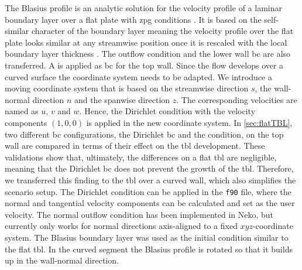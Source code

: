 The Blasius profile is an analytic solution for the velocity profile of a laminar boundary layer over a flat plate with \acrshort{zpg} conditions \citep{blasius_grenzschichtern_1908}.
It is based on the self-similar character of the boundary layer meaning the velocity profile over the flat plate looks similar at any streamwise position once it is rescaled with the local boundary layer thickness \citep{schlichting_boundary-layer_2017}.
The outflow condition and the lower wall \acrshort{bc} are also transferred.
A  is applied as \acrshort{bc} for the top wall.
Since the flow develops over a curved surface the coordinate system needs to be adapted.
We introduce a moving coordinate system that is based on the streamwise direction $s$, the wall-normal direction $n$ and the spanwise direction $z$.
The corresponding velocities are named as $u$, $v$ and $w$.
Hence, the Dirichlet condition with the velocity components $(1,0,0)$ is applied in the new coordinate system.
In \autoref{sec:flatTBL}, two different \acrshort{bc} configurations, the Dirichlet \acrshort{bc} and the  condition, on the top wall are compared in terms of their effect on the \acrshort{tbl} development.
These validations show that, ultimately, the differences on a flat \acrshort{tbl} are negligible, meaning that the Dirichlet \acrshort{bc} does not prevent the growth of the \acrshort{tbl}.
Therefore, we transferred this finding to the \acrshort{tbl} over a curved wall, which also simplifies the scenario setup.
The Dirichlet condition can be applied in the \texttt{f90} file, where the normal and tangential velocity components can be calculated and set as the user velocity. 
The normal outflow condition has been implemented in Neko, but currently only works for normal directions axis-aligned to a fixed $xyz$-coordinate system. 
The Blasius boundary layer was used as the initial condition similar to the flat \acrshort{tbl}.
In the curved segment the Blasius profile is rotated so that it builds up in the wall-normal direction. \\

